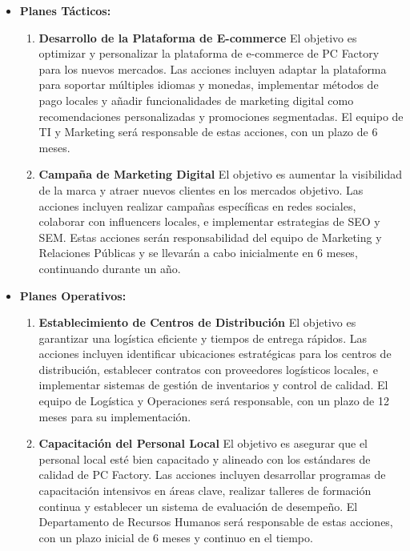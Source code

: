 \documentclass{templateNote}
\begin{document}
\begin{itemize}
    \item \textbf{Planes Tácticos:}
    \begin{enumerate}
        \item \textbf{Desarrollo de la Plataforma de E-commerce} El objetivo es optimizar y personalizar la plataforma de e-commerce de PC Factory para los nuevos mercados. Las acciones incluyen adaptar la plataforma para soportar múltiples idiomas y monedas, implementar métodos de pago locales y añadir funcionalidades de marketing digital como recomendaciones personalizadas y promociones segmentadas. El equipo de TI y Marketing será responsable de estas acciones, con un plazo de 6 meses.
        \item \textbf{Campaña de Marketing Digital} El objetivo es aumentar la visibilidad de la marca y atraer nuevos clientes en los mercados objetivo. Las acciones incluyen realizar campañas específicas en redes sociales, colaborar con influencers locales, e implementar estrategias de SEO y SEM. Estas acciones serán responsabilidad del equipo de Marketing y Relaciones Públicas y se llevarán a cabo inicialmente en 6 meses, continuando durante un año.
    \end{enumerate}
    \item \textbf{Planes Operativos:}
    \begin{enumerate}
        \item \textbf{Establecimiento de Centros de Distribución} El objetivo es garantizar una logística eficiente y tiempos de entrega rápidos. Las acciones incluyen identificar ubicaciones estratégicas para los centros de distribución, establecer contratos con proveedores logísticos locales, e implementar sistemas de gestión de inventarios y control de calidad. El equipo de Logística y Operaciones será responsable, con un plazo de 12 meses para su implementación.
        \item \textbf{Capacitación del Personal Local} El objetivo es asegurar que el personal local esté bien capacitado y alineado con los estándares de calidad de PC Factory. Las acciones incluyen desarrollar programas de capacitación intensivos en áreas clave, realizar talleres de formación continua y establecer un sistema de evaluación de desempeño. El Departamento de Recursos Humanos será responsable de estas acciones, con un plazo inicial de 6 meses y continuo en el tiempo.
    \end{enumerate}
\end{itemize}
\end{document}
